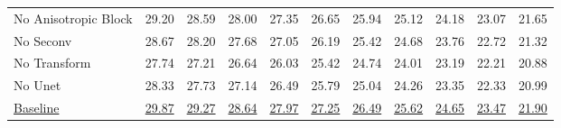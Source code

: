 \begin{table}[!hbt]
\begin{tabular}{lcccccccccc}
    No Anisotropic Block & 29.20 & 28.59 & 28.00 & 27.35 & 26.65 & 25.94 & 25.12 & 24.18 & 23.07 & 21.65 \\
    No Seconv & 28.67 & 28.20 & 27.68 & 27.05 & 26.19 & 25.42 & 24.68 & 23.76 & 22.72 & 21.32 \\
    No Transform & 27.74 & 27.21 & 26.64 & 26.03 & 25.42 & 24.74 & 24.01 & 23.19 & 22.21 & 20.88 \\
    No Unet & 28.33 & 27.73 & 27.14 & 26.49 & 25.79 & 25.04 & 24.26 & 23.35 & 22.33 & 20.99 \\
    \underline{Baseline} & \underline{29.87} & \underline{29.27} & \underline{28.64} & \underline{27.97} & \underline{27.25} & \underline{26.49} & \underline{25.62} & \underline{24.65} & \underline{23.47} & \underline{21.90} \\
    \bottomrule
    \end{tabular}
\end{table}

